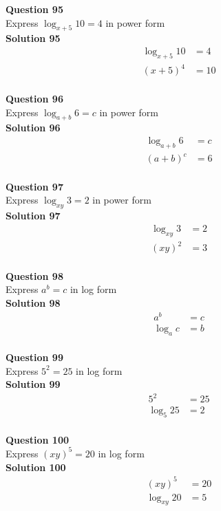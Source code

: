 \documentclass{article}
\begin{document}
\noindent\textbf{Question 95}\\[5pt]
Express $\log_{x+5}10=4$ in power form\\[5pt]
\noindent\textbf{Solution 95}\\[5pt]
\begin{align*}
\log_{x+5}10&=4\\[2pt]
(x+5)^4&=10
\end{align*}\\[10pt]

\noindent\textbf{Question 96}\\[5pt]
Express $\log_{a+b}6=c$ in power form\\[5pt]
\noindent\textbf{Solution 96}\\[5pt]
\begin{align*}
\log_{a+b}6&=c\\[2pt]
(a+b)^c&=6
\end{align*}\\[10pt]

\noindent\textbf{Question 97}\\[5pt]
Express $\log_{xy}3=2$ in power form\\[5pt]
\noindent\textbf{Solution 97}\\[5pt]
\begin{align*}
\log_{xy}3&=2\\[2pt]
(xy)^2&=3
\end{align*}\\[10pt]

\noindent\textbf{Question 98}\\[5pt]
Express $a^b=c$ in log form\\[5pt]
\noindent\textbf{Solution 98}\\[5pt]
\begin{align*}
a^b&=c\\[2pt]
\log_ac&=b
\end{align*}\\[10pt]

\noindent\textbf{Question 99}\\[5pt]
Express $5^2=25$ in log form\\[5pt]
\noindent\textbf{Solution 99}\\[5pt]
\begin{align*}
5^2&=25\\[2pt]
\log_{5}25&=2
\end{align*}\\[10pt]

\noindent\textbf{Question 100}\\[5pt]
Express $(xy)^5=20$ in log form\\[5pt]
\noindent\textbf{Solution 100}\\[5pt]
\begin{align*}
(xy)^5&=20\\[2pt]
\log_{xy}20&=5
\end{align*}\\[10pt]
\end{document}
